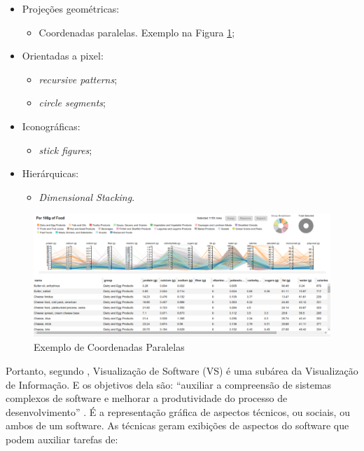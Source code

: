 \begin{itemize}
  \item Projeções geométricas:
	\begin{itemize}
		\item Coordenadas paralelas. Exemplo na Figura \ref{fig:parallel};
	\end{itemize}
  \item Orientadas a pixel:
	\begin{itemize}
		\item \textit{recursive patterns};
		\item \textit{circle segments};
	\end{itemize}
  \item Iconográficas:
	\begin{itemize}
		\item \textit{stick figures};
	\end{itemize}
  \item Hierárquicas:
	\begin{itemize}
		\item \textit{Dimensional Stacking}.
	\end{itemize}
\end{itemize}

\begin{figure}[!htb]
  \centering
    \includegraphics[keepaspectratio=true,scale=0.3]
    {figuras/parallel.eps}
  \caption{Exemplo de Coordenadas Paralelas \cite{kaichang2015}}
  \label{fig:parallel}
\end{figure}

Portanto, segundo , Visualização de Software (VS)
é uma subárea da Visualização de Informação. E os objetivos dela são: ``auxiliar
a compreensão de sistemas complexos de software e melhorar a produtividade do
processo de desenvolvimento'' \cite{messias2012}. É a representação gráfica de
aspectos técnicos, ou sociais, ou ambos de um software. As técnicas geram
exibições de aspectos do software que podem auxiliar tarefas de:

